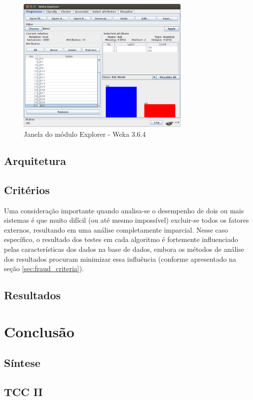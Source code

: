 \begin{figure}[h!]
\centering
\includegraphics[width=0.75\textwidth]{img/weka.png}
\caption{Janela do módulo Explorer - Weka 3.6.4}
\label{fig:prop_weka}
\end{figure}

\section{Arquitetura}

\section{Critérios}

Uma consideração importante quando analisa-se o desempenho de dois ou mais sistemas é que muito difícil (ou até mesmo impossível) excluir-se todos os fatores externos, resultando em uma análise completamente imparcial. Nesse caso específico, o resultado dos testes em cada algoritmo é fortemente influenciado pelas características dos dados na base de dados, embora os métodos de análise dos resultados procuram minimizar essa influência (conforme apresentado na seção \ref{sec:fraud_criteria}).

\section{Resultados}

\chapter{Conclusão}

\section{Síntese}

\section{TCC II}

